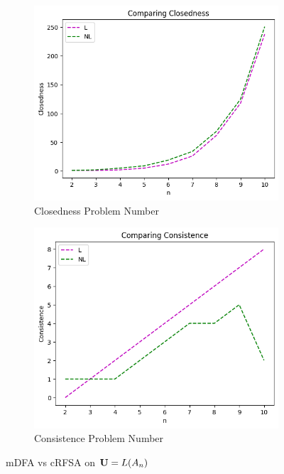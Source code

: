 \begin{figure}[!htb]
  \begin{subfigure}[b]{0.3\textwidth}
    \includegraphics[width=\textwidth]{../statistics/plots/wrostRFSA/Closedness.png}
    \caption{Closedness Problem Number}
    \label{fig:ClosednessWrostRFSACompare}
  \end{subfigure}
  \begin{subfigure}[b]{0.3\textwidth}
    \includegraphics[width=\textwidth]{../statistics/plots/wrostRFSA/Consistence.png}
    \caption{Consistence Problem Number}
    \label{fig:ConsistenceWrostRFSACompare}
  \end{subfigure}
  \caption{mDFA vs cRFSA on $\mathbf{U} = L(A_n)$}
  \label{fig:wrostRFSA}
\end{figure}

